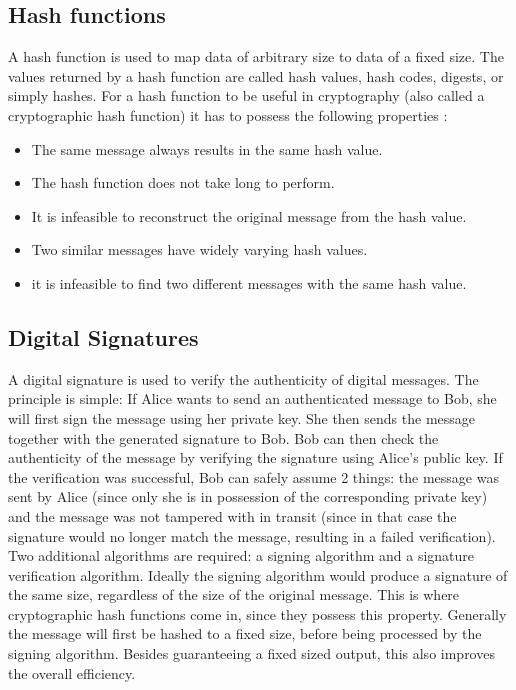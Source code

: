 \subsection{Hash functions} 
\label{subsec:hash_functions}

A hash function is used to map data of arbitrary size to data of a fixed size. The values returned by a hash function are called hash values, hash codes, digests, or simply hashes. For a hash function to be useful in cryptography (also called a cryptographic hash function) it has to possess the following properties \cite{wiki:Hash}:

\begin{itemize}
	\item The same message always results in the same hash value.
	\item The hash function does not take long to perform.
	\item It is infeasible to reconstruct the original message from the hash value.
	\item Two similar messages have widely varying hash values.
	\item it is infeasible to find two different messages with the same hash value.
\end{itemize}

\subsection{Digital Signatures} 
\label{subsec:digital_signature}

A digital signature is used to verify the authenticity of digital messages. The principle is simple: If Alice wants to send an authenticated message to Bob, she will first sign the message using her private key. She then sends the message together with the generated signature to Bob. Bob can then check the authenticity of the message by verifying the signature using Alice's public key. If the verification was successful, Bob can safely assume 2 things: the message was sent by Alice (since only she is in possession of the corresponding private key) and the message was not tampered with in transit (since in that case the signature would no longer match the message, resulting in a failed verification). Two additional algorithms are required: a signing algorithm and a signature verification algorithm. Ideally the signing algorithm would produce a signature of the same size, regardless of the size of the original message. This is where cryptographic hash functions come in, since they possess this property. Generally the message will first be hashed to a fixed size, before being processed by the signing algorithm. Besides guaranteeing a fixed sized output, this also improves the overall efficiency. \cite{wiki:DigitalSignature}

